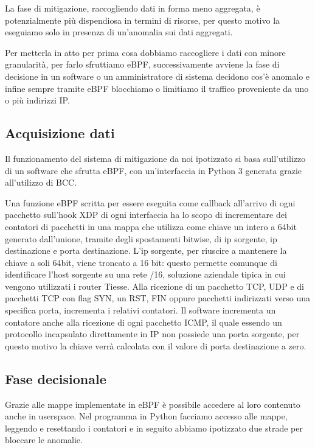 La fase di mitigazione, raccogliendo dati in forma meno aggregata, è potenzialmente più dispendiosa in termini di risorse, per questo motivo la eseguiamo solo in presenza di un'anomalia sui dati aggregati.

Per metterla in atto per prima cosa dobbiamo raccogliere i dati con minore granularità, per farlo sfruttiamo eBPF, successivamente avviene la fase di decisione in un software o un amministratore di sistema decidono cos'è anomalo e infine sempre tramite eBPF blocchiamo o limitiamo il traffico proveniente da uno o più indirizzi IP.

\subsection{Acquisizione dati}

Il funzionamento del sistema di mitigazione da noi ipotizzato si basa sull'utilizzo di un software che sfrutta eBPF, con un'interfaccia in Python 3 generata grazie all'utilizzo di BCC.

Una funzione eBPF scritta per essere eseguita come callback all'arrivo di ogni pacchetto sull'hook XDP di ogni interfaccia ha lo scopo di incrementare dei contatori di pacchetti in una mappa che utilizza come chiave un intero a 64bit generato dall'unione, tramite degli spostamenti bitwise, di ip sorgente, ip destinazione e porta destinazione. L'ip sorgente, per riuscire a mantenere la chiave a soli 64bit, viene troncato a 16 bit: questo permette comunque di identificare l'host sorgente su una rete /16, soluzione aziendale tipica in cui vengono utilizzati i router Tiesse.
Alla ricezione di un pacchetto TCP, UDP e di pacchetti TCP con flag SYN, un RST, FIN oppure pacchetti indirizzati verso una specifica porta, incrementa i relativi contatori. Il software incrementa un contatore anche alla ricezione di ogni pacchetto ICMP, il quale essendo un protocollo incapsulato direttamente in IP non possiede una porta sorgente, per questo motivo la chiave verrà calcolata con il valore di porta destinazione a zero.


\subsection{Fase decisionale}

Grazie alle mappe implementate in eBPF è possibile accedere al loro contenuto anche in userspace. Nel programma in Python facciamo accesso alle mappe, leggendo e resettando i contatori e in seguito abbiamo ipotizzato due strade per bloccare le anomalie.

